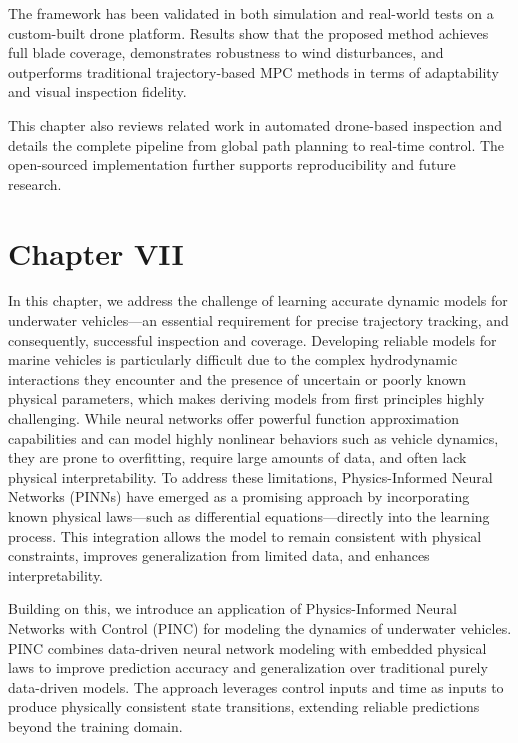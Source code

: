 The framework has been validated in both simulation and real-world tests on a custom-built drone platform. Results show that the proposed method achieves full blade coverage, demonstrates robustness to wind disturbances, and outperforms traditional trajectory-based MPC methods in terms of adaptability and visual inspection fidelity.

This chapter also reviews related work in automated drone-based inspection and details the complete pipeline from global path planning to real-time control. The open-sourced implementation further supports reproducibility and future research.



\section{Chapter VII}
\label{ch:pinc}


In this chapter, we address the challenge of learning accurate dynamic models for underwater vehicles—an essential requirement for precise trajectory tracking, and consequently, successful inspection and coverage. Developing reliable models for marine vehicles is particularly difficult due to the complex hydrodynamic interactions they encounter and the presence of uncertain or poorly known physical parameters, which makes deriving models from first principles highly challenging. While neural networks offer powerful function approximation capabilities and can model highly nonlinear behaviors such as vehicle dynamics, they are prone to overfitting, require large amounts of data, and often lack physical interpretability. To address these limitations, Physics-Informed Neural Networks (PINNs) have emerged as a promising approach by incorporating known physical laws—such as differential equations—directly into the learning process. This integration allows the model to remain consistent with physical constraints, improves generalization from limited data, and enhances interpretability.

Building on this, we introduce an application of Physics-Informed Neural Networks with Control (PINC) for modeling the dynamics of underwater vehicles. PINC combines data-driven neural network modeling with embedded physical laws to improve prediction accuracy and generalization over traditional purely data-driven models. The approach leverages control inputs and time as inputs to produce physically consistent state transitions, extending reliable predictions beyond the training domain.

